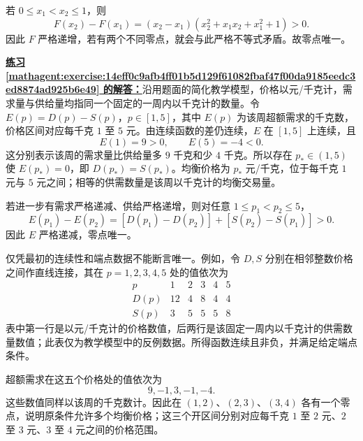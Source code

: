 \documentclass[UTF8,fontset=fandol,11pt]{ctexart}
\begin{document}
若 $0\leq x_1<x_2\leq1$，则
\[
F(x_2)-F(x_1)=(x_2-x_1)(x_2^2+x_1x_2+x_1^2+1)>0.
\]
因此 $F$ 严格递增，若有两个不同零点，就会与此严格不等式矛盾。故零点唯一。\par
\par\noindent\textbf{\hyperref[mathagent:exercise:14eff0c9afb4ff01b5d129f61082fbaf47f00da9185eedc3ed8874ad925b6e49]{练习 \ref*{mathagent:exercise:14eff0c9afb4ff01b5d129f61082fbaf47f00da9185eedc3ed8874ad925b6e49} 的解答：}}沿用题面的简化教学模型，价格以元/千克计，需求量与供给量均指同一个固定的一周内以千克计的数量。令 $E(p)=D(p)-S(p)$，$p\in[1,5]$，其中 $E(p)$ 为该周超额需求的千克数，价格区间对应每千克 $1$ 至 $5$ 元。由连续函数的差仍连续，$E$ 在 $[1,5]$ 上连续，且
\[
E(1)=9>0,\qquad E(5)=-4<0.
\]
这分别表示该周的需求量比供给量多 $9$ 千克和少 $4$ 千克。所以存在 $p_*\in(1,5)$ 使 $E(p_*)=0$，即 $D(p_*)=S(p_*)$。均衡价格为 $p_*$ 元/千克，位于每千克 $1$ 元与 $5$ 元之间；相等的供需数量是该周以千克计的均衡交易量。

若进一步有需求严格递减、供给严格递增，则对任意 $1\leq p_1<p_2\leq5$，
\[
E(p_1)-E(p_2)=[D(p_1)-D(p_2)]+[S(p_2)-S(p_1)]>0.
\]
因此 $E$ 严格递减，零点唯一。

仅凭最初的连续性和端点数据不能断言唯一。例如，令 $D,S$ 分别在相邻整数价格之间作直线连接，其在 $p=1,2,3,4,5$ 处的值依次为
\[
\begin{array}{c|ccccc}
p&1&2&3&4&5\\
D(p)&12&4&8&4&4\\
S(p)&3&5&5&5&8
\end{array}
\]
表中第一行是以元/千克计的价格数值，后两行是该固定一周内以千克计的供需数量数值；此表仅为教学模型中的反例数据。所得函数连续且非负，并满足给定端点条件。

超额需求在这五个价格处的值依次为
\[
9,-1,3,-1,-4.
\]
这些数值同样以该周的千克数计。因此在 $(1,2)$、$(2,3)$、$(3,4)$ 各有一个零点，说明原条件允许多个均衡价格；这三个开区间分别对应每千克 $1$ 至 $2$ 元、$2$ 至 $3$ 元、$3$ 至 $4$ 元之间的价格范围。\par
\end{document}

